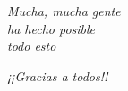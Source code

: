 \begin{frame}[fragile]

  \begin{center}
    {\em \Large
      Mucha, mucha gente \\
      ha hecho posible \\
      todo esto \\
    }
  \end{center}  
  
\end{frame}

\begin{frame}[fragile]

  \begin{center}
    {\em \Huge
      ¡¡Gracias a todos!!
    }
  \end{center}  
  
\end{frame}
